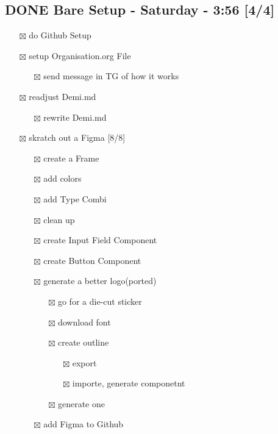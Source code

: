\documentclass[11pt]{article}
\begin{document}
\subsection{{\bfseries\sffamily DONE} Bare Setup - Saturday - 3:56 [4/4]}
\label{sec:org3d19c07}
\begin{itemize}
\item[{$\boxtimes$}] do Github Setup
\item[{$\boxtimes$}] setup Organisation.org File
\begin{itemize}
\item[{$\boxtimes$}] send message in TG of how it works
\end{itemize}
\item[{$\boxtimes$}] readjust Demi.md
\begin{itemize}
\item[{$\boxtimes$}] rewrite Demi.md
\end{itemize}
\item[{$\boxtimes$}] skratch out a Figma [8/8]
\begin{itemize}
\item[{$\boxtimes$}] create a Frame
\item[{$\boxtimes$}] add colors
\item[{$\boxtimes$}] add Type Combi
\item[{$\boxtimes$}] clean up
\item[{$\boxtimes$}] create Input Field Component
\item[{$\boxtimes$}] create Button Component
\item[{$\boxtimes$}] generate a better logo(ported)
\begin{itemize}
\item[{$\boxtimes$}] go for a die-cut sticker
\item[{$\boxtimes$}] download font
\item[{$\boxtimes$}] create outline
\begin{itemize}
\item[{$\boxtimes$}] export
\item[{$\boxtimes$}] importe, generate componetnt
\end{itemize}
\item[{$\boxtimes$}] generate one
\end{itemize}
\item[{$\boxtimes$}] add Figma to Github
\end{itemize}
\end{itemize}
\end{document}
